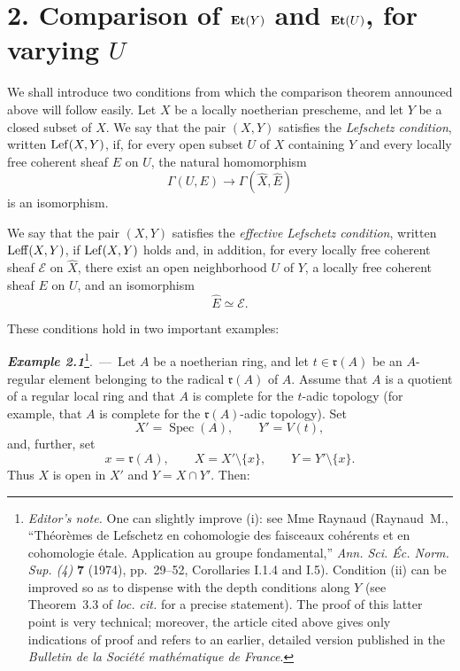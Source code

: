 \section*{2. Comparison of $\Et(Y)$ and $\Et(U)$, for varying $U$}

We shall introduce two conditions from which the comparison theorem announced
above will follow easily. Let $X$ be a locally noetherian prescheme, and let
$Y$ be a closed subset of $X$. We say that the pair $(X,Y)$ satisfies the
\emph{Lefschetz condition}, written $\Lefc(X,Y)$, if, for every open subset
$U$ of $X$ containing $Y$ and every locally free coherent sheaf $E$ on $U$,
the natural homomorphism
\[
  \Gamma(U,E)\longrightarrow\Gamma(\widehat X,\widehat E)
\]
is an isomorphism.

We say that the pair $(X,Y)$ satisfies the \emph{effective Lefschetz
condition}, written $\Leffc(X,Y)$, if $\Lefc(X,Y)$ holds and, in addition,
for every locally free coherent sheaf $\mathcal E$ on $\widehat X$, there
exist an open neighborhood $U$ of $Y$, a locally free coherent sheaf $E$ on
$U$, and an isomorphism
\[
  \widehat E\simeq\mathcal E.
\]

These conditions hold in two important examples:

\medskip
{}\noindent\textbf{\textit{Example 2.1}}\footnote{\textit{Editor's note.}
One can slightly improve (i): see Mme Raynaud (Raynaud~M., ``Théorèmes de
Lefschetz en cohomologie des faisceaux cohérents et en cohomologie étale.
Application au groupe fondamental,'' \emph{Ann. Sci. Éc. Norm. Sup. (4)}
\textbf{7} (1974), pp.~29--52, Corollaries I.1.4 and I.5). Condition (ii) can
be improved so as to dispense with the depth conditions along $Y$ (see
Theorem~3.3 of \emph{loc. cit.} for a precise statement). The proof of this
latter point is very technical; moreover, the article cited above gives only
indications of proof and refers to an earlier, detailed version published in
the \emph{Bulletin de la Société mathématique de France}.}.\ ---\ 
Let $A$ be a noetherian ring, and let $t\in\mathfrak r(A)$ be an
$A$-regular element belonging to the radical $\mathfrak r(A)$ of $A$.
Assume that $A$ is a quotient of a regular local ring and that $A$ is
complete for the $t$-adic topology (for example, that $A$ is complete for
the $\mathfrak r(A)$-adic topology). Set
\[
  X'=\operatorname{Spec}(A),\qquad Y'=V(t),
\]
and, further, set
\[
  x=\mathfrak r(A),\qquad X=X'\setminus\{x\},\qquad
  Y=Y'\setminus\{x\}.
\]
Thus $X$ is open in $X'$ and $Y=X\cap Y'$. Then:

